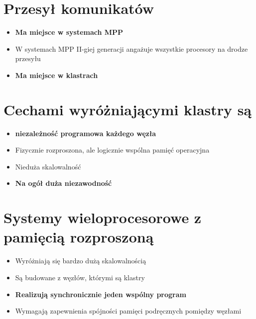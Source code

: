 \documentclass[a4paper,twoside]{article}
\begin{document}
\section{Przesył komunikatów}
	\begin{itemize}
    \item \textbf{Ma miejsce w systemach MPP}
    \item W systemach MPP II-giej generacji angażuje wszystkie procesory na drodze przesyłu
    \item \textbf{Ma miejsce w klastrach}
    \end{itemize}

\section{Cechami wyróżniającymi klastry są}
	\begin{itemize}
    \item \textbf{niezależność programowa każdego węzła}
    \item Fizycznie rozproszona, ale logicznie wspólna pamięć operacyjna
    \item Nieduża skalowalność
    \item \textbf{Na ogół duża niezawodność}
    \end{itemize}

\section{Systemy wieloprocesorowe z pamięcią rozproszoną}
	\begin{itemize}
    \item Wyróżniają się bardzo dużą skalowalnością
    \item Są budowane z węzłów, którymi są klastry
    \item \textbf{Realizują synchronicznie jeden wspólny program}
    \item Wymagają zapewnienia spójności pamięci podręcznych pomiędzy węzłami
    \end{itemize}
\end{document}
